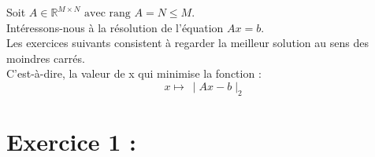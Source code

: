 \documentclass[a4paper, 10pt]{article}
\newcommand{\IR}{\mathbb{R}}
\begin{document}
\renewcommand{\contentsname}{Table des matières}
\tableofcontents

\newpage

Soit \(A \in \IR^{M \times N} \text{ avec rang } A = N \leq M \). \\
Intéressons-nous à la résolution de l'équation \( Ax = b \). \\
Les exercices suivants consistent à regarder la meilleur solution au sens des moindres carrés. \\
C'est-à-dire, la valeur de x qui minimise la fonction :
\[
	x \mapsto ~ \mid Ax - b \mid_2 \label{eq1: norme deux}
\]
\section{Exercice 1 :}
\end{document}
